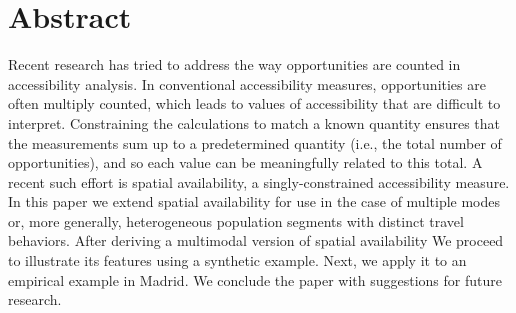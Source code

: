 \documentclass[10pt,letterpaper]{article}
\newcommand{\getIndex}[2]{
  \ForEach{,}{\IfEq{#1}{\thislevelitem}{\number\thislevelcount\ExitForEach}{}}{#2}
}
\newcommand{\getAff}[1]{
  \getIndex{#1}{McMaster,Madrid}
}
\begin{document}
\vspace*{0.2in}


\section*{Abstract}
Recent research has tried to address the way opportunities are counted
in accessibility analysis. In conventional accessibility measures,
opportunities are often multiply counted, which leads to values of
accessibility that are difficult to interpret. Constraining the
calculations to match a known quantity ensures that the measurements sum
up to a predetermined quantity (i.e., the total number of
opportunities), and so each value can be meaningfully related to this
total. A recent such effort is spatial availability, a
singly-constrained accessibility measure. In this paper we extend
spatial availability for use in the case of multiple modes or, more
generally, heterogeneous population segments with distinct travel
behaviors. After deriving a multimodal version of spatial availability
We proceed to illustrate its features using a synthetic example. Next,
we apply it to an empirical example in Madrid. We conclude the paper
with suggestions for future research.
\end{document}
